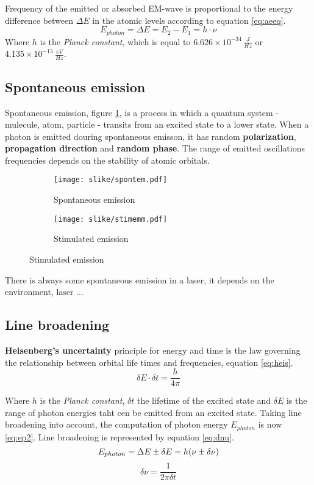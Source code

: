 Frequency of the emitted or absorbed EM-wave is proportional to the
energy difference between $\Delta E$ in the atomic levels according to equation \ref{eq:aeeq}.
\begin{equation}
    E_{photon} = \Delta E = E_2 - E_1 = h \cdot \nu
    \label{eq:aeeq}
\end{equation}
Where $h$ is the \textit{Planck constant}, which is equal to  $6.626 \times 10^{-34} \, \frac{J}{Hz}$ or $4.135 \times 10^{-15} \,\frac{eV}{Hz}$.


\subsection{Spontaneous emission}

Spontaneous emission, figure \ref{fig:spem}, is a process in which a quantum system - mulecule, atom, particle - 
transits from an excited state to a lower state.  When a photon is emitted douring spontaneous emisson, it has random \textbf{polarization}, \textbf{propagation direction} and \textbf{random phase}.
The range of emitted oscillations frequencies depends on the stability of atomic orbitals.
\begin{figure}[h!]
    \centering
    \begin{subfigure}{0.4\textwidth}
        \texttt{[image: slike/spontem.pdf]}
        \caption{Spontaneous emission}
        \label{fig:spem}
    \end{subfigure}
    \begin{subfigure}{0.4\textwidth}
        \texttt{[image: slike/stimemm.pdf]}
        \caption{Stimulated emission}
        \label{fig:stimem}
    \end{subfigure}
\end{figure}

There is always some spontaneous emission in a laser, it depends on the environment, laser ...


\subsection{Line broadening}

\textbf{Heisenberg's uncertainty} principle for energy and time is the law governing the relationship between orbital life times and frequencies, equation \ref{eq:heis}.
\begin{equation}
    \delta E \cdot \delta t = \frac{h}{4 \pi}
    \label{eq:heis}
\end{equation}

Where $h$ is the \textit{Planck constant}, $\delta t$ the lifetime of the excited state and $\delta E$ is the range of photon energies taht cen be emitted from an excited state.
Taking line broadening into account, the computation of photon energy $E_{photon}$ is now \ref{eq:ep2}.
Line broadening is represented by equation \ref{eq:dnu}.
\begin{equation}
    E_{photon} = \Delta E \pm \delta E = h (\nu \pm \delta \nu) \\
    \label{eq:ep2}
\end{equation}
\begin{equation}
    \delta \nu = \frac{1}{2 \pi \delta t}
    \label{eq:dnu}
\end{equation}
